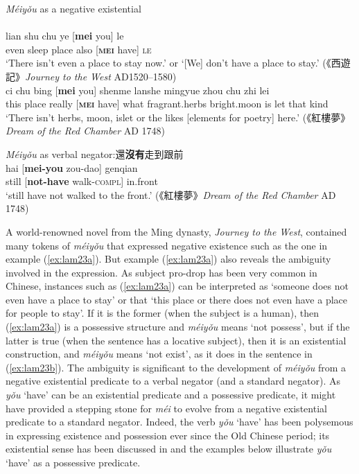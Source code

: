 \documentclass[output=paper,colorlinks,citecolor=brown,chinesefont]{langscibook}
\begin{document}
\ea \textit{Méiyǒu} as a negative existential \label{ex:lam23}\\
   \label{ex:lam23a}\\
  	\gll lian shu chu ye [\textbf{mei} you] le\\ 
  	even sleep place also [\textbf{\textsc{mei}} have] \textsc{le}\\
  	\glt `There isn't even a place to stay now.' or `[We] don't have a place to stay.' ({\cn 《西遊記》}\emph{Journey to the West} AD1520–1580)
  \label{ex:lam23b}\\
  	\gll ci chu bing [\textbf{mei} you] shenme lanshe mingyue zhou chu zhi lei\\
  	this	 place really [\textbf{\textsc{mei}} have] what fragrant.herbs bright.moon is let that kind\\ 
  	\glt `There isn't herbs, moon, islet or the likes [elements for poetry] here.' ({\cn 《紅樓夢》}\emph{Dream of the Red Chamber} AD 1748)
\z \z


\ea \textit{Méiyǒu} as verbal negator:{\cn  還\textbf{沒有}走到跟前} \label{ex:lam24}\\
  \gll hai [\textbf{mei-you} zou-dao] genqian\\
  still [\textbf{not-have} walk-\textsc{compl}] in.front\\
  \glt `still have not walked to the front.' ({\cn 《紅樓夢》}\emph{Dream of the Red Chamber} AD 1748)
\z


A world-renowned novel from the Ming dynasty, \emph{Journey to the West}, contained many tokens of \textit{méiyǒu} that expressed negative existence such as the one in example (\ref{ex:lam23a}). But example (\ref{ex:lam23a}) also reveals the ambiguity involved in the expression. As subject pro-drop has been very common in Chinese, instances such as (\ref{ex:lam23a}) can be interpreted as `someone does not even have a place to stay' or that `this place or there does not even have a place for people to stay'. If it is the former (when the subject is a human), then (\ref{ex:lam23a}) is a possessive structure and \textit{méiyǒu} means `not possess', but if the latter is true (when the sentence has a locative subject), then it is an existential construction, and \textit{méiyǒu} means `not exist', as it does in the sentence in (\ref{ex:lam23b}). The ambiguity is significant to the development of \textit{méiyǒu} from a negative existential predicate to a verbal negator (and a standard negator). As \textit{yǒu} `have' can be an existential predicate and a possessive predicate, it might have provided a stepping stone for \textit{méi} to evolve from a negative existential predicate to a standard negator. Indeed, the verb \textit{yǒu} `have' has been polysemous in expressing existence and possession ever since the Old Chinese period; its existential sense has been discussed in  and the examples below illustrate \textit{yǒu} `have' as a possessive predicate.
\end{document}
